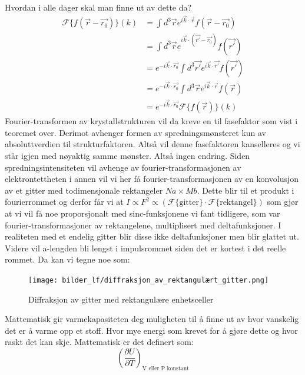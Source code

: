 \documentclass{article}
\begin{document}
Hvordan i alle dager skal man finne ut av dette da?
\begin{align}
    \mathcal{F}\{f(\vec{r}-\vec{r_0})\}(k) &= \int d^3 \vec{r} e^{i \vec{k}\cdot\vec{r}} f(\vec{r}-\vec{r_0})\\
        &= \int d^3 \vec{r} e^{i \vec{k}\cdot (\vec{r'}-\vec{r_0})} f(\vec{r'})\\
    &= e^{-i \vec{k}\cdot\vec{r_0}}\int d^3 \vec{r'} e^{i \vec{k}\cdot \vec{r'}} f(\vec{r'})\\
    &= e^{-i \vec{k}\cdot\vec{r_0}}\int d^3 \vec{r} e^{i \vec{k}\cdot \vec{r}} f(\vec{r})\\
    &= e^{-i \vec{k}\cdot\vec{r_0}} \mathcal{F}\{f(\vec{r})\}(k)
\end{align}
Fourier-transformen av krystallstrukturen vil da kreve en til fasefaktor som vist i teoremet over. Derimot avhenger formen av spredningsmønsteret kun av absoluttverdien til strukturfaktoren. Altså vil denne fasefaktoren kanselleres og vi står igjen med nøyaktig samme mønster. Altså ingen endring.
Siden spredningsintensiteten vil avhenge av fourier-transformasjonen av elektrontettheten i annen vil vi her få fourier-transformasjonen av en konvolusjon av et gitter med todimensjonale rektangeler $Na \times Mb$. Dette blir til et produkt i fourierrommet og derfor får vi at $I \propto F^2 \propto(\mathcal{F}\{\text{gitter}\} \cdot \mathcal{F}\{\text{rektangel}\})$ som gjør at vi vil få noe proporsjonalt med  sinc-funksjonene vi fant tidligere, som var fourier-transformasjoner av rektangelene, multiplisert med deltafunksjoner. I realiteten med et endelig gitter blir disse ikke deltafunksjoner men blir glattet ut. Videre vil a-lengden bli lengst i impulsrommet siden det er kortest i det reelle rommet. Da kan vi tegne noe som:
\begin{figure}[H]
    \centering
    \texttt{[image: bilder\_lf/diffraksjon\_av\_rektangulært\_gitter.png]}
    \caption{Diffraksjon av gitter med rektangulære enhetsceller}
    \label{fig:diffraksjon_av_rektangulært_gitter}
\end{figure}
\nyside
{}
Mattematisk gir varmekapasiteten deg muligheten til å finne ut av hvor vanskelig det er å varme opp et stoff. Hvor mye energi som krevet for å gjøre dette og hvor raskt det kan skje. Mattematisk er det definert som:
\begin{equation}
    \left(\frac{\partial U}{\partial T}\right)_{\text{V eller P konstant}}
\end{equation}
\end{document}
